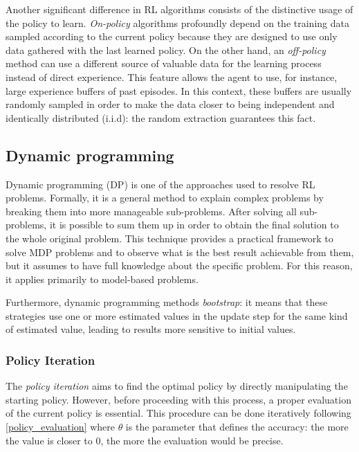 Another significant difference in RL algorithms consists of the distinctive usage of the policy to learn.
\textit{On-policy} algorithms profoundly depend on the training data sampled according to the current policy because they are designed to use only data gathered with the last learned policy.
On the other hand, an \textit{off-policy} method can use a different source of valuable data for the learning process instead of direct experience. This feature allows the agent to use, for instance, large experience buffers of past episodes. In this context, these buffers are usually randomly sampled in order to make the data closer to being independent and identically distributed (i.i.d): the random extraction guarantees this fact.


\subsection{Dynamic programming} \label{dp}

Dynamic programming (DP) is one of the approaches used to resolve RL problems. Formally, it is a general method to explain complex problems by breaking them into more manageable sub-problems. After solving all sub-problems, it is possible to sum them up in order to obtain the final solution to the whole original problem.
This technique provides a practical framework to solve MDP problems and to observe what is the best result achievable from them, but it assumes to have full knowledge about the specific problem. For this reason, it applies primarily to model-based problems.

Furthermore, dynamic programming methods \textit{bootstrap}: it means that these strategies use one or more estimated values in the update step for the same kind of estimated value, leading to results more sensitive to initial values.

\subsubsection{Policy Iteration}

The \textit{policy iteration} aims to find the optimal policy by directly manipulating the starting policy. However, before proceeding with this process, a proper evaluation of the current policy is essential. This procedure can be done iteratively following \vref{policy_evaluation} where $\theta$ is the parameter that defines the accuracy: the more the value is closer to $0$, the more the evaluation would be precise.

